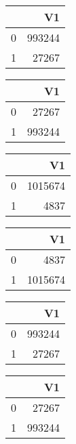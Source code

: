 \bigskip\bigskip
\centering
\begin{tabular}{rr}
  \hline
 & V1 \\ 
  \hline
0 & 993244 \\ 
  1 & 27267 \\ 
   \hline
\end{tabular}

\bigskip\bigskip
\centering
\begin{tabular}{rr}
  \hline
 & V1 \\ 
  \hline
0 & 27267 \\ 
  1 & 993244 \\ 
   \hline
\end{tabular}

\bigskip\bigskip
\centering
\begin{tabular}{rr}
  \hline
 & V1 \\ 
  \hline
0 & 1015674 \\ 
  1 & 4837 \\ 
   \hline
\end{tabular}

\bigskip\bigskip
\centering
\begin{tabular}{rr}
  \hline
 & V1 \\ 
  \hline
0 & 4837 \\ 
  1 & 1015674 \\ 
   \hline
\end{tabular}

\bigskip\bigskip
\centering
\begin{tabular}{rr}
  \hline
 & V1 \\ 
  \hline
0 & 993244 \\ 
  1 & 27267 \\ 
   \hline
\end{tabular}

\bigskip\bigskip
\centering
\begin{tabular}{rr}
  \hline
 & V1 \\ 
  \hline
0 & 27267 \\ 
  1 & 993244 \\ 
   \hline
\end{tabular}

